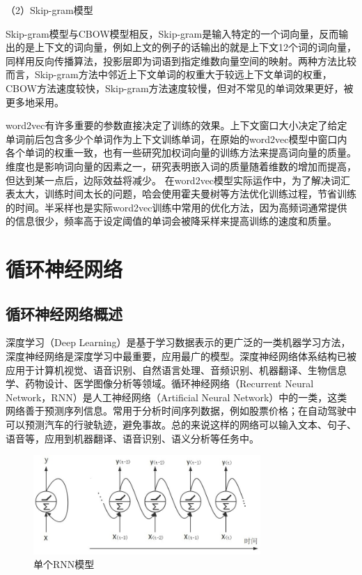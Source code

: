 \documentclass[winfonts,master,oneside,nobackinfo]{njuthesis}
\begin{document}
（2）Skip-gram模型

Skip-gram模型与CBOW模型相反，Skip-gram是输入特定的一个词向量，反而输出的是上下文的词向量，例如上文的例子的话输出的就是上下文12个词的词向量，同样用反向传播算法，投影层即为词语到指定维数向量空间的映射。两种方法比较而言，Skip-gram方法中邻近上下文单词的权重大于较远上下文单词的权重\cite{Mikolov1}，CBOW方法速度较快，Skip-gram方法速度较慢，但对不常见的单词效果更好，被更多地采用。

word2vec有许多重要的参数直接决定了训练的效果。上下文窗口大小决定了给定单词前后包含多少个单词作为上下文训练单词，在原始的word2vec模型中窗口内各个单词的权重一致，也有一些研究加权词向量的训练方法\cite{myh}来提高词向量的质量。维度也是影响词向量的因素之一，研究表明嵌入词的质量随着维数的增加而提高，但达到某一点后，边际效益将减少\cite{Mikolov}。
在word2vec模型实际运作中，为了解决词汇表太大，训练时间太长的问题，哈会使用霍夫曼树等方法优化训练过程，节省训练的时间。半采样也是实际word2vec训练中常用的优化方法，因为高频词通常提供的信息很少，频率高于设定阈值的单词会被降采样来提高训练的速度和质量。

\section{循环神经网络}

\subsection{循环神经网络概述}

深度学习（Deep Learning）是基于学习数据表示的更广泛的一类机器学习方法，深度神经网络是深度学习中最重要，应用最广的模型。深度神经网络体系结构已被应用于计算机视觉、语音识别、自然语言处理、音频识别、机器翻译、生物信息学、药物设计、医学图像分析等领域。循环神经网络（Recurrent Neural Network，RNN）是人工神经网络（Artificial Neural Network）中的一类，这类网络善于预测序列信息。常用于分析时间序列数据，例如股票价格；在自动驾驶中可以预测汽车的行驶轨迹，避免事故。总的来说这样的网络可以输入文本、句子、语音等，应用到机器翻译、语音识别、语义分析等任务中。

\begin{figure}[h]
\centering
\includegraphics[width=0.77\textwidth]{./figure/RNN.jpg}
\caption{单个RNN模型}
\label{one-level-rnn}
\end{figure}
\end{document}

